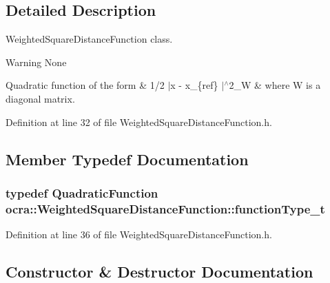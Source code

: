 \subsection{Detailed Description}
Weighted\+Square\+Distance\+Function class. 

\begin{DoxyWarning}{Warning}
None
\end{DoxyWarning}
Quadratic function of the form \& 1/2 $|$x -\/ x\+\_\+\{ref\} $|$$^\wedge$2\+\_\+W \& where W is a diagonal matrix. 

Definition at line 32 of file Weighted\+Square\+Distance\+Function.\+h.



\subsection{Member Typedef Documentation}
\subsubsection[{\texorpdfstring{function\+Type\+\_\+t}{functionType_t}}]{\setlength{\rightskip}{0pt plus 5cm}typedef {\bf Quadratic\+Function} {\bf ocra\+::\+Weighted\+Square\+Distance\+Function\+::function\+Type\+\_\+t}}\hypertarget{classocra_1_1WeightedSquareDistanceFunction_ab8fcee2e8ec81e8790f3d00b1d541d9a}{}\label{classocra_1_1WeightedSquareDistanceFunction_ab8fcee2e8ec81e8790f3d00b1d541d9a}


Definition at line 36 of file Weighted\+Square\+Distance\+Function.\+h.



\subsection{Constructor \& Destructor Documentation}
